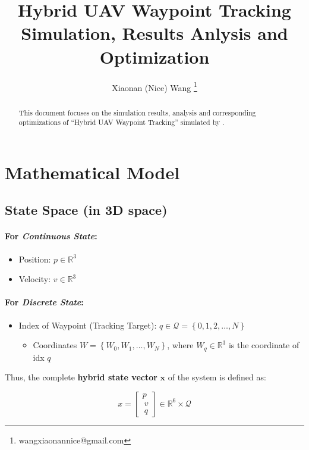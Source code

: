 \documentclass{article}
\title{Hybrid UAV Waypoint Tracking Simulation, Results Anlysis and Optimization}
\author{
  Xiaonan (Nice) Wang \thanks{wangxiaonannice@gmail.com} \\
}
\begin{document}
\newcommand{\repeatfootnote}[1]{\textsuperscript{\ref{#1}}}

\maketitle

\begin{abstract}
This document focuses on the simulation results, analysis and corresponding optimizations of ``Hybrid UAV Waypoint Tracking'' simulated by \cite{panerati2021learning}.
\end{abstract}

\section{Mathematical Model}
\subsection{State Space (in 3D space)}
                           
\paragraph{For \textit{Continuous State}:} 
\begin{itemize}
  \item Position: $p\in\mathbb{R}^3$
  \item Velocity: $v\in\mathbb{R}^3$
\end{itemize}

\paragraph{For \textit{Discrete State}:}
\begin{itemize}
  \item Index of Waypoint (Tracking Target): $q\in\mathcal{Q}=\left\lbrace 0,1,2,\dots,N \right\rbrace$
  \begin{itemize}
    \item Coordinates $W=\left\lbrace W_0,W_1,\dots,W_N \right\rbrace$, where $W_q\in\mathbb{R}^3$ is the coordinate of idx $q$
  \end{itemize}
\end{itemize}

Thus, the complete \textbf{hybrid state vector} $\bm{x}$ of the system is defined as:

\begin{equation}
  x = \begin{bmatrix} p \\\ v \\\ q \end{bmatrix} \in \mathbb{R}^6 \times \mathcal{Q}
\end{equation}
\end{document}
